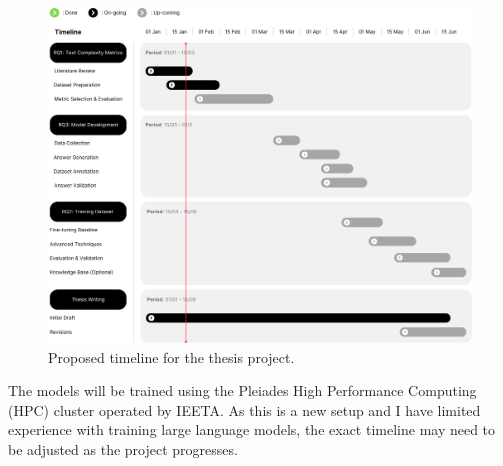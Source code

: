 \begin{figure}[!htbp]
    \centering
    \includegraphics[width=\textwidth]{img/timeline.png}
    \caption{Proposed timeline for the thesis project.}
    \label{fig:gantt}
\end{figure}

The models will be trained using the Pleiades High Performance Computing (HPC) cluster operated by IEETA. As this is a new setup and I have limited experience with training large language models, the exact timeline may need to be adjusted as the project progresses.
